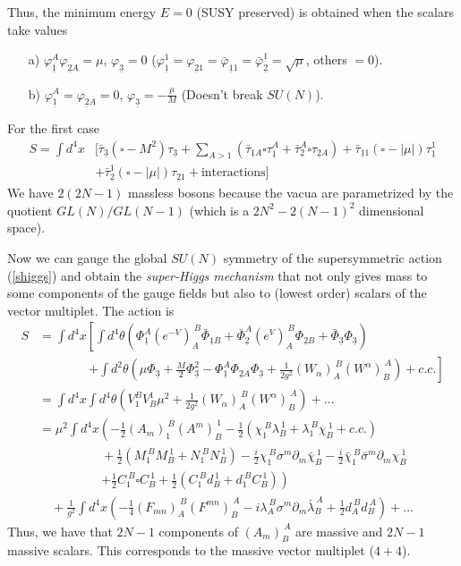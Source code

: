 \documentclass[a4paper,12pt]{article}
\numberwithin{equation}{section}
\numberwithin{exe}{section}
\newcommand{\p}{{\partial}}
\renewcommand{\u}[1]{{\underline #1}}
\renewcommand{\a}{{\alpha}}
\renewcommand{\l}{{\lambda}}
\newcommand{\lb}{{\bar\lambda}}
\newcommand{\m}{{\mu}}
\newcommand{\s}{{\sigma}}
\renewcommand{\sb}{{\bar\sigma}}
\renewcommand{\t}{{\theta}}
\newcommand{\vphi}{{\varphi}}
\newcommand{\vphib}{{\bar\varphi}}
\newcommand{\chib}{{\bar\chi}}
\newcommand{\taub}{{\bar\tau}}
\newcommand{\Phib}{{\bar \Phi}}
\begin{document}
Thus, the minimum energy $E=0$ (SUSY preserved) is obtained when the scalars take values
	\begin{itemize}
	\item[a)] $\vphi^A_\u1 \vphi_{\u2 A}=\m$, $\vphi_\u3 =0$ ($\vphi^1_\u1=\vphi_{\u2 1}=\vphib_{\u1 1}=\vphib^1_\u2=\sqrt\m$, others $=0$).
	\item[b)] $\vphi^A_\u1 = \vphi_{\u2 A}=0$, $\vphi_\u3 = -\frac{\m}{M}$ (Doesn't break $SU(N)$).
	\end{itemize}
For the first case
	\begin{align}
	S = \int d^4x & \Big[\taub_\u3 (\square - M^2)\tau_\u3 + \sum_{A>1} (\taub_{\u1 A}\square \tau^A_\u1 + \taub^A_{\u2}\square\tau_{\u2 A}) + \taub_{\u1 1}(\square - |\m|)\tau^1_\u1 \nonumber \\
	& + \taub^1_\u2 (\square - |\m|)\tau_{\u2 1} + \text{interactions} \Big]
	\end{align}
We have $2(2N-1)$ massless bosons because the vacua are parametrized by the quotient $GL(N)/GL(N-1)$ (which is a $2N^2-2(N-1)^2$ dimensional space).

Now we can gauge the global $SU(N)$ symmetry of the supersymmetric action (\ref{shiggs}) and obtain the {\it super-Higgs mechanism} that not only gives mass to some components of the gauge fields but also to (lowest order) scalars of the vector multiplet. The action is
	\begin{align}
	S & = \int d^4x \left[ \int d^4\t \left(\Phi^A_\u1(e^{-V})_A^{\ B}\Phib_{\u1 B} + \Phib^A_\u2(e^{V})_A^{\ B}\Phi_{\u2 B} + \Phib_\u3\Phi_\u3\right) \right. \nonumber \\
	& \qquad\qquad \left. + \int d^2\t(\m\Phi_\u3 + \frac{M}{2}\Phi^2_\u3 - \Phi^A_\u1\Phi_{\u2 A}\Phi_\u3 + \frac{1}{2g^2} (W_\a)_A^{\ B}(W^\a)_B^{\ A}) + c.c.  \right] \nonumber \\
	& = \int d^4x \int d^4\t \left( V^B_1 V^1_B \m^2 + \frac{1}{2g^2} (W_\a)_A^{\ B} (W^\a)_B^{\ A}\right) + \ldots \nonumber \\
	& = \m^2 \int d^4 x\left( -\frac12 (A_m)_1^{\ B} (A^m)_B^{\ 1} - \frac12(\chi_1^{\ B}\l_B^{\ 1} + \l_1^{\ B}\chi_B^{\ 1} + c.c.) \right. \nonumber \\
	& \qquad\qquad\quad + \frac12 (M_1^{\ B} M_B^{\ 1} + N_1^{\ B} N_B^{\ 1}) - \frac{i}{2} \chi_1^{\ B}\s^m\p_m\chib_B^{\ 1} - \frac{i}{2} \chib_1^{\ B}\sb^m\p_m\chi_B^{\ 1} \nonumber \\
	& \qquad\qquad\quad \left. +\frac12 C_1^{\ B}\square C_B^{\ 1} + \frac12 (C_1^{\ B} d_B^{\ 1} + d_1^{\ B} C_B^{\ 1}) \right) \nonumber \\
	& \quad + \frac{1}{g^2} \int d^4x \left( -\frac14(F_{mn})_A^{\ B}(F^{mn})_B^{\ A} - i\l_A^{\ B}\s^m\p_m\lb_B^{\ A} + \frac12 d_A^{\ B} d_B^{\ A} \right) + \ldots
	\end{align}
Thus, we have that $2N-1$ components of $(A_m)_B^{\ A}$ are massive and $2N-1$ massive scalars. This corresponds to the massive vector multiplet ($4+4$).
\end{document}
